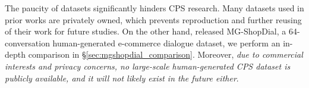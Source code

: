 The paucity of datasets significantly hinders CPS research. Many datasets used in prior works \cite{xiao-etal-2021-end, chen-etal-2020-jddc, zhao-etal-2022-jddc} are privately owned, which prevents reproduction and further reusing of their work for future studies.
On the other hand, \citet{Bernard:2023:SIGIR} released MG-ShopDial, a 64-conversation human-generated e-commerce dialogue dataset, %
we perform an in-depth comparison in \S\ref{sec:mgshopdial_comparison}. Moreover, \textit{due to commercial interests and privacy concerns, no large-scale human-generated CPS dataset is publicly available, and it will not likely exist in the future either}. %


